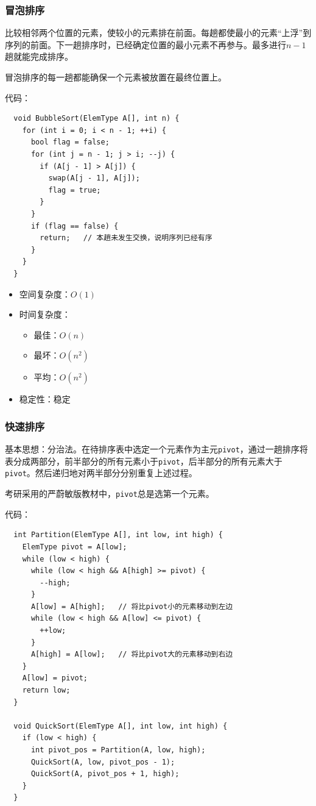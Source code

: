 \documentclass[12pt, a4paper, oneside]{ctexart}
\begin{document}
\subsubsection{冒泡排序}

比较相邻两个位置的元素，使较小的元素排在前面。每趟都使最小的元素“上浮”到序列的前面。下一趟排序时，已经确定位置的最小元素不再参与。最多进行$n-1$趟就能完成排序。

冒泡排序的每一趟都能确保一个元素被放置在最终位置上。

代码：
\begin{lstlisting}
  void BubbleSort(ElemType A[], int n) {
    for (int i = 0; i < n - 1; ++i) {
      bool flag = false;
      for (int j = n - 1; j > i; --j) {
        if (A[j - 1] > A[j]) {
          swap(A[j - 1], A[j]);
          flag = true;
        }
      }
      if (flag == false) {
        return;   // 本趟未发生交换，说明序列已经有序
      }
    }
  }
\end{lstlisting}

\begin{itemize}
  \item 空间复杂度：$O(1)$
  \item 时间复杂度：
  \begin{itemize}
    \item 最佳：$O(n)$
    \item 最坏：$O(n^2)$
    \item 平均：$O(n^2)$
  \end{itemize}
  \item 稳定性：稳定
\end{itemize}

\subsubsection{快速排序}

基本思想：分治法。在待排序表中选定一个元素作为主元\verb|pivot|，通过一趟排序将表分成两部分，前半部分的所有元素小于\verb|pivot|，后半部分的所有元素大于\verb|pivot|。然后递归地对两半部分分别重复上述过程。

考研采用的严蔚敏版教材中，\verb|pivot|总是选第一个元素。

代码：
\begin{lstlisting}
  int Partition(ElemType A[], int low, int high) {
    ElemType pivot = A[low];
    while (low < high) {
      while (low < high && A[high] >= pivot) {
        --high;
      }
      A[low] = A[high];   // 将比pivot小的元素移动到左边
      while (low < high && A[low] <= pivot) {
        ++low;
      }
      A[high] = A[low];   // 将比pivot大的元素移动到右边
    }
    A[low] = pivot;
    return low;
  }

  void QuickSort(ElemType A[], int low, int high) {
    if (low < high) {
      int pivot_pos = Partition(A, low, high);
      QuickSort(A, low, pivot_pos - 1);
      QuickSort(A, pivot_pos + 1, high);
    }
  }
\end{lstlisting}
\end{document}
